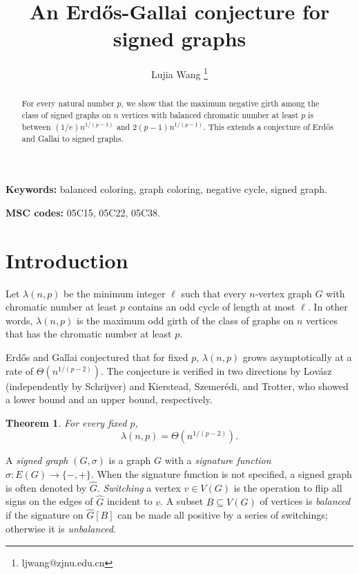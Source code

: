 \documentclass{article}
\title{An Erd\H{o}s-Gallai conjecture for signed graphs}
\author{Lujia Wang \thanks{ljwang@zjnu.edu.cn}}
\date{}
\affil{Zhejiang Normal University}
\newtheorem{theorem}{Theorem}[section]
\begin{document}
\maketitle
	
\begin{abstract}
For every natural number $p$, we show that the maximum negative girth among the class of signed graphs on $n$ vertices with balanced chromatic number at least $p$ is between $(1/e)n^{1/(p-1)}$ and $2(p-1) n^{1/(p-1)}$. This extends a conjecture of Erd\H{o}s and Gallai to signed graphs.


\end{abstract}

\textbf{Keywords:} balanced coloring, graph coloring, negative cycle, signed graph.

\textbf{MSC codes:} 05C15, 05C22, 05C38.



\section{Introduction}
Let $\lambda(n,p)$ be the minimum integer $\ell$ such that every $n$-vertex graph $G$ with chromatic number at least $p$ contains an odd cycle of length at most $\ell$. In other words, $\lambda(n,p)$ is the maximum odd girth of the class of graphs on $n$ vertices that has the chromatic number at least $p$.

Erd\H{o}s and Gallai\cite{E79} conjectured that for fixed $p$, $\lambda(n,p)$ grows asymptotically at a rate of $\Theta(n^{1/(p-2)})$. The conjecture is verified in two directions by Lov\'{a}sz\cite{L77} (independently by Schrijver\cite{S78}) and Kierstead, Szemer\'{e}di, and Trotter\cite{KST84}, who showed a lower bound and an upper bound, respectively.

\begin{theorem}\label{thm:EGconjecture}
    For every fixed $p$, 
    $$\lambda(n,p)=\Theta(n^{1/(p-2)}).$$
\end{theorem}

A \emph{signed graph} $(G,\sigma)$ is a graph $G$ with a \emph{signature function} $\sigma:E(G)\to\{-,+\}$. When the signature function is not specified, a signed graph is often denoted by $\widehat{G}$. \emph{Switching} a vertex $v\in V(G)$ is the operation to flip all signs on the edges of $\widehat{G}$ incident to $v$. A subset $B\subseteq V(G)$ of vertices is \emph{balanced} if the signature on $\widehat{G}[B]$ can be made all positive by a series of switchings; otherwise it is \emph{unbalanced}.
\end{document}
